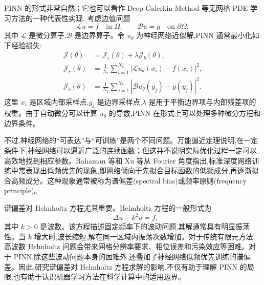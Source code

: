 \documentclass[12pt,hyperref,a4paper,UTF8,twoside]{ctexart}
\newcommand{\calL}{\mathcal L}
\newcommand{\calJ}{\mathcal J}
\begin{document}
PINN 的形式非常自然；它也可以看作 Deep Galerkin Method 等无网格 PDE 学习方法的一种代表性实现\cite{sirignano2018dgm,lu2021deepxde,karniadakis2021physics}. 考虑边值问题
\begin{equation}\label{eq:pde-general}
    \calL u=f\quad \text{in }\Omega,\qquad
    \mathcal B u=g\quad \text{on }\partial\Omega,
\end{equation}
其中 $\calL$ 是微分算子,$\mathcal B$ 是边界算子。令 $u_\theta$ 为神经网络近似解,PINN 通常最小化如下经验损失:
\begin{equation}\label{eq:pinn-loss-general}
\begin{aligned}
    \calJ(\theta)
    &=\calJ_r(\theta)+\lambda\calJ_b(\theta),\\
    \calJ_r(\theta)
    &=\frac{1}{N_r}\sum_{i=1}^{N_r}
    \left|\calL u_\theta(x_i)-f(x_i)\right|^2,\\
    \calJ_b(\theta)
    &=\frac{1}{N_b}\sum_{j=1}^{N_b}
    \left|\mathcal B u_\theta(y_j)-g(y_j)\right|^2.
\end{aligned}
\end{equation}
这里 $x_i$ 是区域内部采样点,$y_j$ 是边界采样点,$\lambda$ 是用于平衡边界项与内部残差项的权重。由于自动微分可以计算 $u_\theta$ 的导数,PINN 在形式上可以处理多种微分方程和边界条件。

不过,神经网络的“可表达”与“可训练”是两个不同问题。万能逼近定理说明,在一定条件下,神经网络可以逼近广泛的连续函数\cite{cybenko1989approximation,hornik1989multilayer}；但这并不说明实际优化过程一定可以高效地找到相应参数。Rahaman 等\cite{rahaman2019spectral}和 Xu 等\cite{xu2020frequency}从 Fourier 角度指出,标准深度网络训练中常表现出低频优先的现象,即网络倾向于先拟合目标函数的低频成分,再逐渐拟合高频成分。这种现象通常被称为谱偏差(spectral bias)或频率原则(frequency principle)。

谱偏差对 Helmholtz 方程尤其重要。Helmholtz 方程的一般形式为
\begin{equation}\label{eq:helmholtz-general}
    -\Delta u-k^2u=f,
\end{equation}
其中 $k>0$ 是波数。该方程描述固定频率下的波动问题,其解通常具有明显振荡性。当 $k$ 增大时,波长缩短,解在同一区域内振荡次数增加。对于传统有限元方法,高波数 Helmholtz 问题会带来网格分辨率要求、相位误差和污染效应等困难\cite{ihlenburg1998finite,babuska1997pollution,melenk2011wavenumber,ernst2012helmholtz}。对于 PINN,除这些波动问题本身的困难外,还叠加了神经网络低频优先训练的谱偏差。因此,研究谱偏差对 Helmholtz 方程求解的影响,不仅有助于理解 PINN 的局限,也有助于认识机器学习方法在科学计算中的适用边界。
\end{document}
